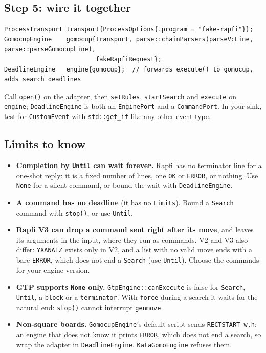 \documentclass[11pt,a4paper]{article}
\newcommand{\code}[1]{\texttt{#1}}
\begin{document}
\subsection{Step 5: wire it together}

\begin{lstlisting}
ProcessTransport transport{ProcessOptions{.program = "fake-rapfi"}};
GomocupEngine    gomocup{transport, parse::chainParsers(parseVcLine, parse::parseGomocupLine),
                         fakeRapfiRequest};
DeadlineEngine   engine{gomocup};  // forwards execute() to gomocup, adds search deadlines
\end{lstlisting}

\noindent Call \code{open()} on the adapter, then \code{setRules}, \code{startSearch} and
\code{execute} on \code{engine}; \code{DeadlineEngine} is both an \code{EnginePort} and a
\code{CommandPort}. In your sink, test for \code{CustomEvent} with \code{std::get\_if} like any
other event type.

\subsection{Limits to know}

\begin{itemize}
  \item \textbf{Completion by \code{Until} can wait forever.} Rapfi has no terminator line for a
        one-shot reply: it is a fixed number of lines, one \code{OK} or \code{ERROR}, or nothing.
        Use \code{None} for a silent command, or bound the wait with \code{DeadlineEngine}.
  \item \textbf{A command has no deadline} (it has no \code{Limits}). Bound a \code{Search}
        command with \code{stop()}, or use \code{Until}.
  \item \textbf{Rapfi V3 can drop a command sent right after its move}, and leaves its arguments
        in the input, where they run as commands. V2 and V3 also differ: \code{YXANALZ} exists
        only in V2, and a list with no valid move ends with a bare \code{ERROR}, which does not
        end a \code{Search} (use \code{Until}). Choose the commands for your engine version.
  \item \textbf{GTP supports \code{None} only.} \code{GtpEngine::canExecute} is false for
        \code{Search}, \code{Until}, a \code{block} or a \code{terminator}. With \code{force}
        during a search it waits for the natural end: \code{stop()} cannot interrupt
        \code{genmove}.
  \item \textbf{Non-square boards.} \code{GomocupEngine}'s default script sends
        \code{RECTSTART w,h}; an engine that does not know it prints \code{ERROR}, which does not
        end a search, so wrap the adapter in \code{DeadlineEngine}. \code{KataGomoEngine} refuses
        them.
\end{itemize}
\end{document}
